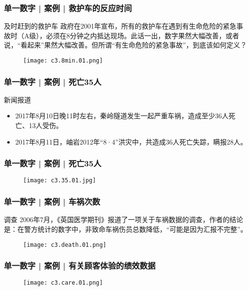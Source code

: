 \begin{frame}
  \frametitle{单一数字 | 案例 | 救护车的反应时间}
  \begin{block}{及时赶到的救护车}
政府在2001年宣布，所有的救护车在遇到有生命危险的紧急事故时（A级），必须在8分钟之内抵达现场。此话一出，数字果然大幅改善，或者说，“看起来”果然大幅改善。但所谓“有生命危险的紧急事故”，到底该如何定义？
  \end{block}
  \begin{figure}
    \centering
    \texttt{[image: c3.8min.01.png]}
  \end{figure}
\end{frame}

\begin{frame}
  \frametitle{单一数字 | 案例 | 死亡35人}
  \begin{block}{新闻报道}
    \begin{itemize}
      \item 2017年8月10日晚11时左右，秦岭隧道发生一起严重车祸，造成至少36人死亡、13人受伤。
      \item 2017年8月11日，岫岩2012年“8·4”洪灾中，共造成36人死亡失踪，瞒报28人。
    \end{itemize}
  \end{block}
\end{frame}

\begin{frame}
  \frametitle{单一数字 | 案例 | 死亡35人}
  \begin{figure}
    \centering
    \texttt{[image: c3.35.01.jpg]}
  \end{figure}
\end{frame}

\begin{frame}
  \frametitle{单一数字 | 案例 | 车祸次数}
  \begin{block}{调查}
    2006年7月，《英国医学期刊》报道了一项关于车祸数据的调查，作者的结论是：在警方统计的数字中，非致命车祸伤员总数降低，“可能是因为汇报不完整”。
  \end{block}
  \begin{figure}
    \centering
    \texttt{[image: c3.death.01.png]}
  \end{figure}
\end{frame}

\begin{frame}
  \frametitle{单一数字 | 案例 | 有关顾客体验的绩效数据}
  \begin{figure}
    \centering
    \texttt{[image: c3.care.01.png]}
  \end{figure}
\end{frame}

